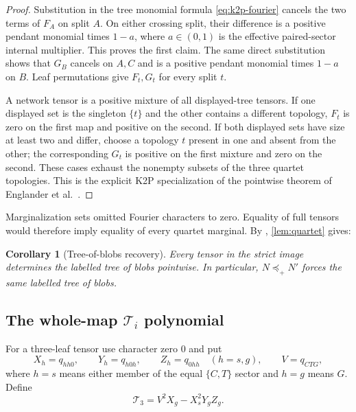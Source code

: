 \documentclass[11pt]{article}
\newtheorem{corollary}[theorem]{Corollary}
\theoremstyle{remark}
\newcommand{\preceqplus}{\preceq_+}
\newcommand{\1}{\mathbf 1}
\begin{document}
\begin{proof}
Substitution in the tree monomial formula \eqref{eq:k2p-fourier} cancels the
two terms of \(F_A\) on split \(A\).  On either crossing split, their
difference is a positive pendant monomial times \(1-a\), where \(a\in(0,1)\)
is the effective paired-sector internal multiplier.  This proves the first
claim.  The same direct substitution shows that \(G_B\) cancels on \(A,C\)
and is a positive pendant monomial times \(1-a\) on \(B\).  Leaf
permutations give \(F_t,G_t\) for every split \(t\).

A network tensor is a positive mixture of all displayed-tree tensors.  If one
displayed set is the singleton \(\{t\}\) and the other contains a different
topology, \(F_t\) is zero on the first map and positive on the second.  If
both displayed sets have size at least two and differ, choose a topology
\(t\) present in one and absent from the other; the corresponding \(G_t\)
is positive on the first mixture and zero on the second.  These cases exhaust
the nonempty subsets of the three quartet topologies.  This is the explicit
K2P specialization of the pointwise theorem of
Englander et al.~\cite[Propositions~2.9--2.10 and
Theorem~2.11]{EnglanderEtAl2026}.
\end{proof}

Marginalization sets omitted Fourier characters to zero.  Equality of full
tensors would therefore imply equality of every quartet marginal.  By
\cite[Corollary~2.12]{EnglanderEtAl2026}, \cref{lem:quartet} gives:

\begin{corollary}[Tree-of-blobs recovery]\label{cor:tree-blobs}
Every tensor in the strict image determines the labelled tree of blobs
pointwise.  In particular, \(N\preceqplus N'\) forces the same labelled tree
of blobs.
\end{corollary}

\subsection{The whole-map \texorpdfstring{\(\mathcal T_i\)}{Ti} polynomial}

For a three-leaf tensor use character zero \(0\) and put
\[
 X_h=q_{hh0},\qquad Y_h=q_{h0h},\qquad Z_h=q_{0hh}\quad(h=s,g),
 \qquad V=q_{CTG},
\]
where \(h=s\) means either member of the equal \(\{C,T\}\) sector and
\(h=g\) means \(G\).  Define
\begin{equation}\label{eq:Ti}
 \mathcal T_3=V^2X_g-X_s^2Y_gZ_g.
\end{equation}
\end{document}

